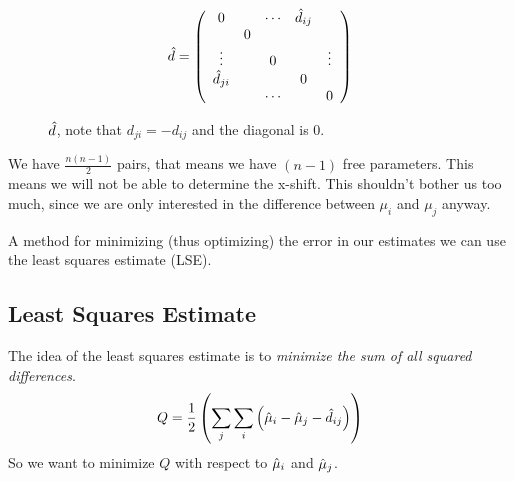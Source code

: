 \documentclass[../main/Notes.tex]{subfiles}
\begin{document}
\begin{figure}[hb]
  \centering
  \begin{align*}
    \est{d}=\left( \begin{array}{ccccc}
      0            &   & \cdots & \est{d_{ij}} &  \\
                   & 0 &        &              &  \\
      \vdots       &   & 0      &              & \vdots \\
      \est{d_{ji}} &   &        & 0            &  \\
                   &   & \cdots &              & 0 
    \end{array} \right)
  \end{align*}
  \caption{$\est{d}$, note that $d_{ji} = -d_{ij}$ and the diagonal is 0.}
  \label{fig:2014-07-04-est_d_exp}
\end{figure}

We have $\frac{n(n-1)}{2}$ pairs, that means we have $(n-1)$ free parameters. This means we will not be able to determine the x-shift. This shouldn't bother us too much, since we are only interested in the difference between $\mu_i$ and $\mu_j$ anyway.

A method for minimizing (thus optimizing) the error in our estimates we can use the least squares estimate (LSE).

\subsection{Least Squares Estimate}
The idea of the least squares estimate is to \emph{minimize the sum of all squared differences}.
\begin{align*}
Q = \frac{1}{2}\left( \sum\limits_j \sum\limits_i \left( \est{\mu_i}-\est{\mu_j} - \est{d_{ij}} \right) \right)
\end{align*}
So we want to minimize $Q$ with respect to $\est{\mu_i}$ and $\est{\mu_j}$. 
\end{document}
